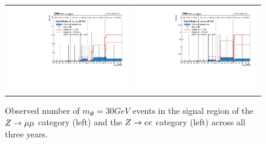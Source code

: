 \begin{figure}[htb!]
\begin{tabular}{c c}
		\includegraphics[width=0.45\linewidth]{figs/05_analysis/closure_ZH_MU_m30_data_2016.pdf} &
		\includegraphics[width=0.45\linewidth]{figs/05_analysis/closure_ZH_ELE_m30_data_2016.pdf} \\
	\end{tabular}
	\caption[Observed number of $m_\Phi=30\unit{GeV}$ events in the signal region of the $\VZ\to\mu\mu$ category (left) and the $\VZ\to ee$ category (left) across all three years.]{Observed number of $m_\Phi=30\unit{GeV}$ events in the signal region of the $\VZ\to\mu\mu$ category (left) and the $\VZ\to ee$ category (left) across all three years.}
	\label{fig:results_m30}
\end{figure}

